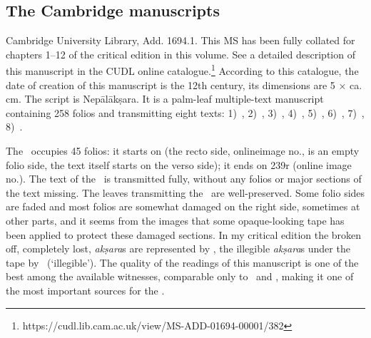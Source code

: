 

\medskip
\subsection{The Cambridge manuscripts}

\noindent
{}
Cambridge University Library, Add. 1694.1. This MS has been 
fully collated for chapters 1--12 of the critical edition in this volume. 
See a detailed description of this manuscript in the 
CUDL online catalogue.\footnote{https://cudl.lib.cam.ac.uk/view/MS-ADD-01694-00001/382}
According to this catalogue, the date of creation of this manuscript 
is the 12th century, its dimensions are 5 × ca. cm. 
The script is Nepālākṣara. It is a palm-leaf multiple-text manuscript containing 258
folios and transmitting eight texts: 
1)~,
2)~, 
3)~, 
4)~, 
5)~, 
6)~,
7)~,
8)~.

The \VSS\ occupies 45 folios: it starts on  
(the recto side, onlineimage no., is an empty folio side,
the text itself starts on the verso side); 
it ends on \fol239r (online image no.). 
The text of the \VSS\ is transmitted fully,
without any folios or major sections of the text missing. The leaves
transmitting the \VSS\ are well-preserved. Some folio sides are faded and
most folios are somewhat damaged on the right side, sometimes at other parts, and it seems from the images that some opaque-looking tape has been applied to protect these damaged sections. 
In my critical edition
the broken off, completely lost, \emph{akṣara}s are represented by \lost,
the illegible \emph{akṣara}s under the tape by \il\ (`illegible'). The
quality of the readings of this manuscript is one of the best among
the available witnesses, comparable only to \msNa\ and \msP, 
making it one of the most important sources for the \VSS.


